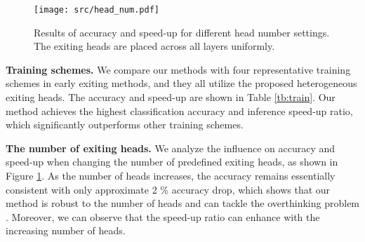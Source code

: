   \begin{figure}
    \begin{center}
      \texttt{[image: src/head\_num.pdf]}
    \end{center}
    \vspace{-8pt}
    \caption{Results of accuracy and speed-up for different head number settings. The exiting heads are placed across all layers uniformly. }
    \label{fig:head_num}
    \vspace{-15pt}
  \end{figure}

\textbf{Training schemes.} 
We compare our methods with four representative training schemes in early exiting methods, and they all utilize the proposed heterogeneous exiting heads. 
The accuracy and speed-up are shown in Table \ref{tb:train}. 
Our method achieves the highest classification accuracy and inference speed-up ratio, which significantly outperforms other training schemes. 

    
  \textbf{The number of exiting heads.} 
  We analyze the influence on accuracy and speed-up when changing the number of predefined exiting heads, as shown in Figure \ref{fig:head_num}. 
  As the number of heads increases, the accuracy remains essentially consistent with only approximate 2 \% accuracy drop, 
  which shows that our method is robust to the number of heads and can tackle the overthinking problem \cite{SDN}. 
  Moreover, we can observe that the speed-up ratio can enhance with the increasing number of heads. 
  
  
